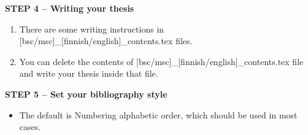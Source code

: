 {\textbf{STEP 4 -- Writing your thesis}}

\begin{enumerate}
\item There are some writing instructions in [bsc/msc]\_[finnish/english]\_contents.tex files.
\item You can delete the contents of [bsc/msc]\_[finnish/english]\_contents.tex file and write your thesis inside that file.
\end{enumerate}

{\textbf{STEP 5 -- Set your bibliography style}}

\begin{itemize}
\item The default is Numbering alphabetic order, which should be used in most cases.
\end{itemize}
